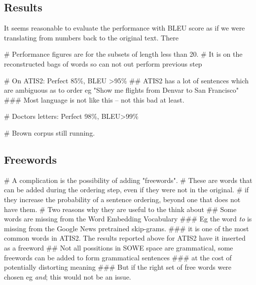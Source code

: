 \documentclass[]{scrartcl}
\numberwithin{equation}{section}
\numberwithin{figure}{section}
\theoremstyle{plain}
\theoremstyle{definition}
\begin{document}
\subsection{Results}
It seems reasonable to evaluate the performance with BLEU score as if we were translating from numbers back to the original text. 
There 
\begin{easylist}[itemize]
	# Performance figures are for the subsets of length less than 20. 
	# It is on the reconstructed bags of words so can not out perform previous step
	
	# On ATIS2: Perfect 85\%,  BLEU >95\%
	## ATIS2 has a lot of sentences which are ambiguous as to order eg "Show me flights from Denvar to San Francisco"
	### Most language is not like this -- not this bad at least.
	
	# Doctors letters: Perfect 98\%, BLEU>99\%
	
	# Brown corpus still running.
\end{easylist}
 

\subsection{Freewords}
\begin{easylist}[itemize]
# A complication is the possibility of adding "freewords".
# These are words that can be added during the ordering step, even if they were not in the original.
# if they increase the probability of a sentence ordering, beyond one that does not have them.
# Two reasons why they are useful to the think about
## Some words are missing from the Word Embedding Vocabulary
### Eg the word \emph{to} is missing from the Google News pretrained skip-grams. 
### it is one of the most common words in ATIS2. The results reported above for ATIS2 have it inserted as a freeword
## Not all possitions in SOWE space are grammatical, some freewords can be added to form grammatical sentences 
### at the cost of potentially distorting meaning
### But if the right set of free words were chosen eg \emph{and}; this would not be an issue.
\end{easylist}


 
\newcommand{\mdiagram}[4][0.9]{%
\begin{landscape}
	
\end{landscape}
}
\end{document}
